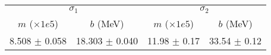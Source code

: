 \begin{tabular}{cc|cc}
\multicolumn{2}{c|}{$\sigma_1$} & \multicolumn{2}{|c}{$\sigma_2$} \\
$m$ ($\times1e5$) & $b$ (MeV) & $m$ ($\times1e5$) & $b$ (MeV) \\
\hline
8.508 $\pm$ 0.058 & 18.303 $\pm$ 0.040 & 11.98 $\pm$ 0.17 & 33.54 $\pm$ 0.12\\
\end{tabular}
